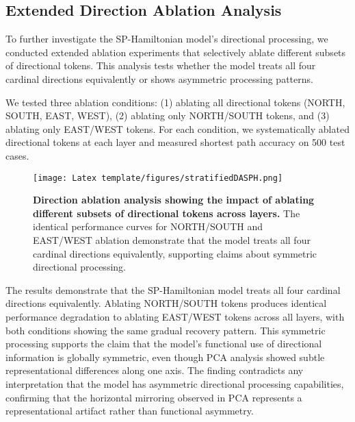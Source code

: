 \subsection{Extended Direction Ablation Analysis}

To further investigate the SP-Hamiltonian model's directional processing, we conducted extended ablation experiments that selectively ablate different subsets of directional tokens. This analysis tests whether the model treats all four cardinal directions equivalently or shows asymmetric processing patterns.

We tested three ablation conditions: (1) ablating all directional tokens (NORTH, SOUTH, EAST, WEST), (2) ablating only NORTH/SOUTH tokens, and (3) ablating only EAST/WEST tokens. For each condition, we systematically ablated directional tokens at each layer and measured shortest path accuracy on 500 test cases.

\begin{figure}[H]
\centering
\texttt{[image: Latex template/figures/stratifiedDASPH.png]}
\caption[Extended direction ablation analysis for SP-Hamiltonian model]{\textbf{Direction ablation analysis showing the impact of ablating different subsets of directional tokens across layers.} The identical performance curves for NORTH/SOUTH and EAST/WEST ablation demonstrate that the model treats all four cardinal directions equivalently, supporting claims about symmetric directional processing.}
\label{fig:direction_ablation_extended}
\end{figure}

The results demonstrate that the SP-Hamiltonian model treats all four cardinal directions equivalently. Ablating NORTH/SOUTH tokens produces identical performance degradation to ablating EAST/WEST tokens across all layers, with both conditions showing the same gradual recovery pattern. This symmetric processing supports the claim that the model's functional use of directional information is globally symmetric, even though PCA analysis showed subtle representational differences along one axis. The finding contradicts any interpretation that the model has asymmetric directional processing capabilities, confirming that the horizontal mirroring observed in PCA represents a representational artifact rather than functional asymmetry.


